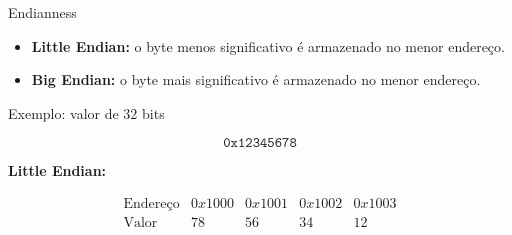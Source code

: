 

\begin{frame}{Endianness}
    \begin{itemize}
        \item \textbf{Little Endian:} o byte menos significativo
        é armazenado no menor endereço.

        \item \textbf{Big Endian:} o byte mais significativo
        é armazenado no menor endereço.
    \end{itemize}

    \vspace{0.5cm}

    Exemplo: valor de 32 bits

    \[
        \texttt{0x12345678}
    \]

    \vspace{0.3cm}

    \textbf{Little Endian:}

    \[
        \begin{array}{c|cccc}
        \text{Endereço} & 0x1000 & 0x1001 & 0x1002 & 0x1003 \\
        \hline
        \text{Valor} & 78 & 56 & 34 & 12
        \end{array}
    \]

\end{frame}